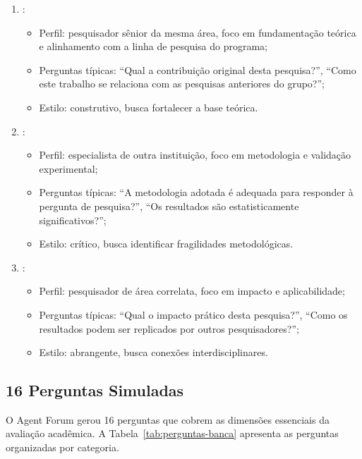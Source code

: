 \begin{enumerate}
\item {}:
    \begin{itemize}
    \item Perfil: pesquisador sênior da mesma área, foco em fundamentação
          teórica e alinhamento com a linha de pesquisa do programa;
    \item Perguntas típicas: ``Qual a contribuição original desta pesquisa?'',
          ``Como este trabalho se relaciona com as pesquisas anteriores do
          grupo?'';
    \item Estilo: construtivo, busca fortalecer a base teórica.
    \end{itemize}
\item {}:
    \begin{itemize}
    \item Perfil: especialista de outra instituição, foco em metodologia e
          validação experimental;
    \item Perguntas típicas: ``A metodologia adotada é adequada para responder
          à pergunta de pesquisa?'', ``Os resultados são estatisticamente
          significativos?'';
    \item Estilo: crítico, busca identificar fragilidades metodológicas.
    \end{itemize}
\item {}:
    \begin{itemize}
    \item Perfil: pesquisador de área correlata, foco em impacto e
          aplicabilidade;
    \item Perguntas típicas: ``Qual o impacto prático desta pesquisa?'',
          ``Como os resultados podem ser replicados por outros pesquisadores?'';
    \item Estilo: abrangente, busca conexões interdisciplinares.
    \end{itemize}
\end{enumerate}

\subsection{16 Perguntas Simuladas}

O Agent Forum gerou 16 perguntas que cobrem as dimensões essenciais da
avaliação acadêmica. A Tabela~\ref{tab:perguntas-banca} apresenta as perguntas
organizadas por categoria.

